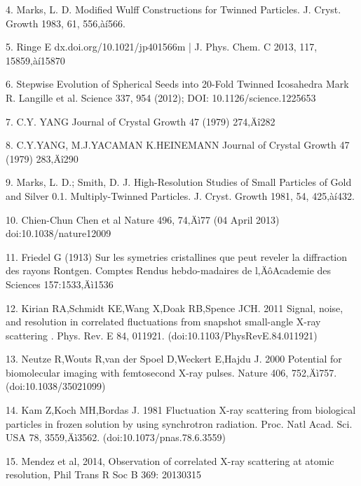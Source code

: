 \documentclass [11pt,fleqn]{article}
\begin{document}
4. Marks, L. D. Modified Wulff Constructions for Twinned Particles. J. Cryst. Growth 1983, 61, 556‚àí566.

5. Ringe E dx.doi.org/10.1021/jp401566m | J. Phys. Chem. C 2013, 117, 15859‚àí15870

6. Stepwise Evolution of Spherical Seeds into 20-Fold Twinned Icosahedra Mark R. Langille et al. Science 337, 954 (2012); DOI: 10.1126/science.1225653

7. C.Y. YANG Journal of Crystal Growth 47 (1979) 274‚Äî282

8. C.Y.YANG, M.J.YACAMAN K.HEINEMANN Journal of Crystal Growth 47 (1979) 283‚Äî290

9. Marks, L. D.; Smith, D. J. High-Resolution Studies of Small Particles of Gold and Silver 0.1. Multiply-Twinned Particles. J. Cryst. Growth 1981, 54, 425‚àí432.

10. Chien-Chun Chen et al Nature 496, 74‚Äì77 (04 April 2013) doi:10.1038/nature12009

11. Friedel G (1913) Sur les symetries cristallines que peut reveler la diffraction des rayons Rontgen. Comptes Rendus hebdo-madaires de l‚ÄôAcademie des Sciences 157:1533‚Äì1536

12. Kirian RA,Schmidt KE,Wang X,Doak RB,Spence JCH. 2011 Signal, noise, and resolution in correlated fluctuations from snapshot small-angle X-ray scattering . Phys. Rev. E 84, 011921. (doi:10.1103/PhysRevE.84.011921)

13. Neutze R,Wouts R,van der Spoel D,Weckert E,Hajdu J. 2000 Potential for biomolecular imaging with femtosecond X-ray pulses. Nature 406, 752‚Äì757. (doi:10.1038/35021099)

14. Kam Z,Koch MH,Bordas J. 1981 Fluctuation X-ray scattering from biological particles in frozen solution by using synchrotron radiation. Proc. Natl Acad. Sci. USA 78, 3559‚Äì3562. (doi:10.1073/pnas.78.6.3559)

15. Mendez et al, 2014,  Observation of correlated X-ray scattering at atomic resolution, Phil Trans R Soc B 369: 20130315
\end{document}
